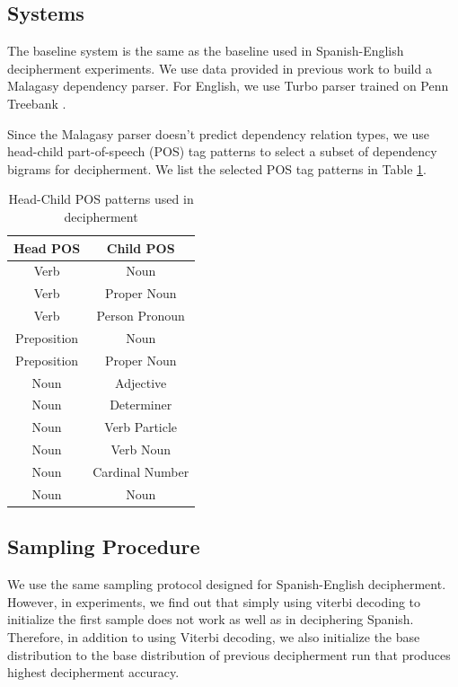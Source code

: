 \subsection{Systems}
The baseline system is the same as the baseline used in Spanish-English decipherment experiments. We use data provided in previous work \cite{dou-vaswani-knight:2014:EMNLP2014} to build a Malagasy dependency parser. For English, we use Turbo parser trained on Penn Treebank \cite{TurboParser}.  

Since the Malagasy parser doesn't predict dependency relation types, we use head-child part-of-speech (POS) tag patterns to select a subset of dependency bigrams for decipherment. We list the selected POS tag patterns in Table \ref{mlg-en-dep-type}.

%
 \begin{table}
 \begin{center}
 \begin{tabular}{ |c|c| } \hline
          Head POS & Child POS \\ \hline
Verb & Noun \\ \hline
Verb & Proper Noun \\ \hline
Verb & Person Pronoun \\ \hline
Preposition & Noun \\ \hline
Preposition & Proper Noun \\ \hline
Noun & Adjective \\ \hline
Noun & Determiner \\ \hline
Noun & Verb Particle \\ \hline
Noun & Verb Noun \\ \hline
Noun & Cardinal Number \\ \hline
Noun & Noun \\ \hline
 \end{tabular}
 \caption{Head-Child POS patterns used in decipherment}
 \label{mlg-en-dep-type}
 \end{center}
 \end{table}
%

\subsection{Sampling Procedure}
We use the same sampling protocol designed for Spanish-English decipherment. However, in experiments, we find out that simply using viterbi decoding to initialize the first sample does not work as well as in deciphering Spanish. Therefore, in addition to using Viterbi decoding, we also initialize the base distribution to the base distribution of previous decipherment run that produces highest decipherment accuracy.

